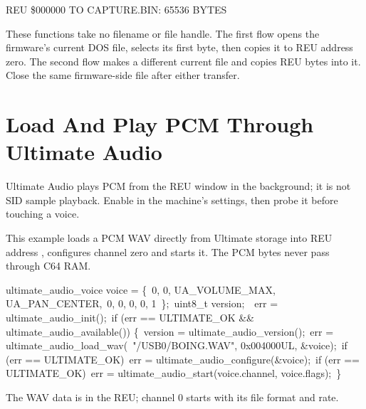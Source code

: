 \begin{resultbox}
REU \$000000 TO CAPTURE.BIN: 65536 BYTES
\end{resultbox}

These functions take no filename or file handle. The first flow opens the
firmware's current DOS file, selects its first byte, then copies it to REU
address zero. The second flow makes a different current file and copies REU
bytes into it. Close the same firmware-side file after either transfer.


\section{Load And Play PCM Through Ultimate Audio}

Ultimate Audio plays PCM from the REU window in the background; it is not SID
sample playback. Enable  in the machine's
settings, then probe it before touching a voice.

This example loads a PCM WAV directly from Ultimate storage into REU address
, configures channel zero and starts it. The PCM bytes never pass
through C64 RAM.

\begin{listingbox}
ultimate\_audio\_voice voice = \{\
\hspace*{1em}0, 0, UA\_VOLUME\_MAX, UA\_PAN\_CENTER,\
\hspace*{1em}0, 0, 0, 0, 1\
\};\
uint8\_t version;\
\
err = ultimate\_audio\_init();\
if (err == ULTIMATE\_OK \&\& ultimate\_audio\_available()) \{\
\hspace*{1em}version = ultimate\_audio\_version();\
\hspace*{1em}err = ultimate\_audio\_load\_wav(\
\hspace*{2em}"/USB0/BOING.WAV", 0x004000UL, \&voice);\
\hspace*{1em}if (err == ULTIMATE\_OK)\
\hspace*{2em}err = ultimate\_audio\_configure(\&voice);\
\hspace*{1em}if (err == ULTIMATE\_OK)\
\hspace*{2em}err = ultimate\_audio\_start(voice.channel, voice.flags);\
\}
\end{listingbox}

\begin{resultbox}
The WAV data is in the REU; channel 0 starts with its file format and rate.
\end{resultbox}

